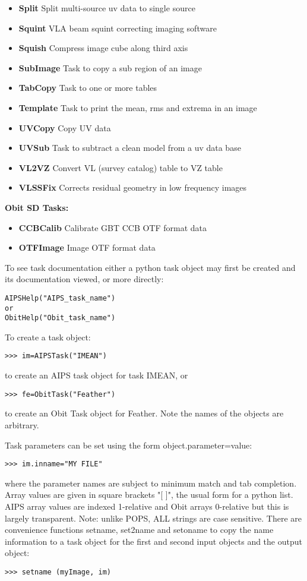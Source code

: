 \documentclass[11pt]{report}
\begin{document}
\begin{itemize}
\item {\bf Split}     Split multi-source uv data to single source
\item {\bf Squint}    VLA beam squint correcting imaging software
\item {\bf Squish}    Compress image cube along third axis
\item {\bf SubImage}  Task to copy a sub region of an image
\item {\bf TabCopy}   Task to one or more tables
\item {\bf Template}  Task to print the mean, rms and extrema in an image
\item {\bf UVCopy}    Copy UV data
\item {\bf UVSub}     Task to subtract a clean model from a uv data base
\item {\bf VL2VZ}     Convert VL (survey catalog) table to VZ table
\item {\bf VLSSFix}   Corrects residual geometry in low frequency images
\end{itemize}

{\bf Obit SD Tasks:}
\begin{itemize}
\item {\bf CCBCalib}  Calibrate GBT CCB OTF format data
\item {\bf OTFImage}  Image OTF format data
\end{itemize}

   To see task documentation either a python task object may first
be created and its documentation viewed, or more directly:
\begin{verbatim}
AIPSHelp("AIPS_task_name")
or
ObitHelp("Obit_task_name")
\end{verbatim}

   To create a task object:
\begin{verbatim}
>>> im=AIPSTask("IMEAN")
\end{verbatim}
to create an AIPS task object for task IMEAN, or

\begin{verbatim}
>>> fe=ObitTask("Feather")
\end{verbatim}
to create an Obit Task object for Feather.
Note the names of the objects are arbitrary.

Task parameters can be set using the form object.parameter=value:
\begin{verbatim}
>>> im.inname="MY FILE"
\end{verbatim}
where the parameter names are subject to minimum match and tab completion.
Array values are given in square brackets "[  ]", the usual form
for a python list.  AIPS array values are indexed 1-relative and Obit
arrays 0-relative but this is largely transparent.
Note: unlike POPS, ALL strings are case sensitive.
There are convenience functions setname, set2name and setoname to copy
the name information to a task object for the first and second input
objects and the output object:
\begin{verbatim}
>>> setname (myImage, im)
\end{verbatim}
\end{document}
